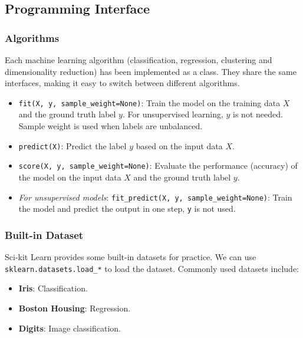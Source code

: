 \documentclass[beamer, en, version=2.0]{huangfusl-template}
\begin{document}
    \subsection{Programming Interface}

    \begin{frame}[fragile]
        \frametitle{Algorithms}

        Each machine learning algorithm (classification, regression, clustering and dimensionality reduction) has been implemented as a class. They share the same interfaces, making it easy to switch between different algorithms.

        \begin{itemize}
            \item {\color{blue}\footnotesize\verb|fit(X, y, sample_weight=None)|}: Train the model on the training data $X$ and the ground truth label $y$. For unsupervised learning, $y$ is not needed. Sample weight is used when labels are unbalanced.
            \item {\color{blue}\footnotesize\verb|predict(X)|}: Predict the label $y$ based on the input data $X$.
            \item {\color{blue}\footnotesize\verb|score(X, y, sample_weight=None)|}: Evaluate the performance (accuracy) of the model on the input data $X$ and the ground truth label $y$.
            \item \textit{For unsupervised models}: {\color{blue}\footnotesize\verb|fit_predict(X, y, sample_weight=None)|}: Train the model and predict the output in one step, {\color{blue}\footnotesize\verb|y|} is not used.
        \end{itemize}
    \end{frame}

    \begin{frame}[fragile]
        \frametitle{Built-in Dataset}

        Sci-kit Learn provides some built-in datasets for practice. We can use {\footnotesize\color{darkred}\verb|sklearn.datasets.load_*|} to load the dataset. Commonly used datasets include:

        \begin{itemize}
            \item \textbf{Iris}: Classification.
            \item \textbf{Boston Housing}: Regression.
            \item \textbf{Digits}: Image classification.
        \end{itemize}
    \end{frame}
\end{document}
